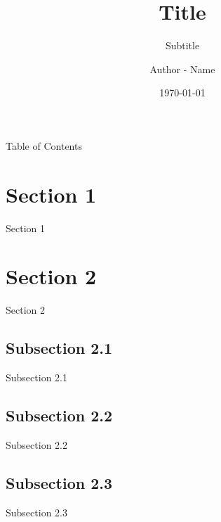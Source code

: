 \documentclass[aspectratio=169,11pt]{beamer}
\title[Title]{Title}
\date{\today}
\subtitle{Subtitle}
\author[]{Author - Name}
\institute[University-Faculty-School]{
        {\large \textbf{University}} %
       \\%
        {\large \textbf{Faculty}} %
          \\%
       {\large \textbf{Professional School}}\\
       \vspace{4mm} 
       \begin{center}
            {\large course (acronym) } \\ 
            {\large Teacher's name}
       \end{center}
     }
\begin{document}
  \begin{frame}[t] %
    \maketitle
  \end{frame}
  
  \begin{frame}[t,plain]{Table of Contents}
   	\tableofcontents
  \end{frame}
  
  
\section{Section 1}

  \begin{frame}[t,plain]{Section 1}
    \lipsum[1]
  \end{frame}
   
   
   
   
\section{Section 2}

   \begin{frame}[t,plain]{Section 2 }
   	 \lipsum[1]
   \end{frame}


  \subsection{Subsection 2.1}
  \begin{frame}{Subsection 2.1}
  	\lipsum[1]
  \end{frame}
  
  \subsection{Subsection 2.2}
  \begin{frame}{Subsection 2.2}
  	\lipsum[1]
  \end{frame}


  \subsection{Subsection 2.3}
  \begin{frame}{Subsection 2.3}
  	\lipsum[1]
  \end{frame}
  
\end{document}
